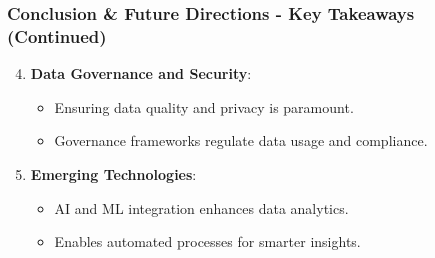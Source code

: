 \documentclass[aspectratio=169]{beamer}
\begin{document}
\begin{frame}[fragile]
    \frametitle{Conclusion \& Future Directions - Key Takeaways (Continued)}
    \begin{enumerate}
        \setcounter{enumi}{3} %
        \item \textbf{Data Governance and Security}:
        \begin{itemize}
            \item Ensuring data quality and privacy is paramount.
            \item Governance frameworks regulate data usage and compliance.
        \end{itemize}

        \item \textbf{Emerging Technologies}:
        \begin{itemize}
            \item AI and ML integration enhances data analytics.
            \item Enables automated processes for smarter insights.
        \end{itemize}
    \end{enumerate}
\end{frame}
\end{document}
